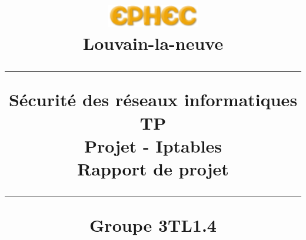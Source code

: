 \title{
\parbox{15cm}
{\includegraphics[width=4cm]{ephec.png} \\ 
  Louvain-la-neuve\\
  \vspace{3cm}
	\begin{center}\sf\bfseries\Huge
		\rule{15cm}{1pt}
		\medskip
		Sécurité des réseaux informatiques TP \\
		\huge Projet - Iptables\\
		\vspace{.5cm}
		\Large Rapport de projet
		\vspace{.5cm}
		\rule{15cm}{1pt}
		\large Groupe 3TL1.4
	\end{center}
	\vspace{3cm}
}} 